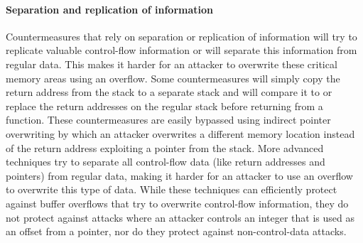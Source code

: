 \paragraph{Separation and replication of information}
Countermeasures that rely on separation or replication of information will try to replicate valuable control-flow information \cite{Younan:2006:EPA,Younan:2006:EPA2, Chiueh:2001:RCT, Vendicator:20xx:DS} or will separate this information from regular data. This makes it harder for an attacker to overwrite these critical memory areas using an overflow. Some countermeasures will simply copy the return address from the stack to a separate stack and will compare it to or replace the return addresses on the regular stack before returning from a function. These countermeasures are easily bypassed using indirect pointer overwriting by which an attacker overwrites a different memory location instead of the return address exploiting a pointer from the stack. More advanced techniques try to separate all control-flow data (like return addresses and pointers) from regular data, making it harder for an attacker to use an overflow to overwrite this type of data.
While these techniques can efficiently protect against buffer overflows that try to overwrite control-flow information, they do not protect against attacks where an attacker controls an integer that is used as an offset from a pointer, nor do they protect against non-control-data attacks.


%

